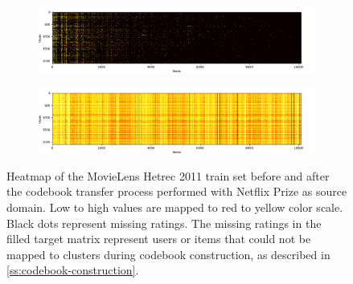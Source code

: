 \vspace*{\fill}
\begin{figure}[hbt!]
\centering
\begin{subfigure}{\textwidth}
\includegraphics[width=\textwidth]{pictures/movielens-full-target}
\end{subfigure}
\begin{subfigure}{\textwidth}
\includegraphics[width=\textwidth]{pictures/movielens-full-target-filled}
\end{subfigure}
\caption{Heatmap of the MovieLens Hetrec 2011 train set before and after the codebook transfer process performed with Netflix Prize as source domain. Low to high values are mapped to red to yellow color scale. Black dots represent missing ratings. The missing ratings in the filled target matrix represent users or items that could not be mapped to clusters during codebook construction, as described in \autoref{ss:codebook-construction}.}
\end{figure}
\vspace*{\fill}

